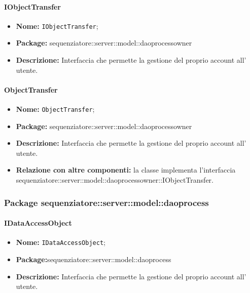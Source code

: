 \paragraph{IObjectTransfer}
	\begin{itemize}
		\item \textbf{Nome:} \texttt{IObjectTransfer};
		\item \textbf{Package:} sequenziatore::server::model::daoprocessowner
		\item \textbf{Descrizione:} Interfaccia che permette la gestione del proprio account all' utente.
	\end{itemize}
\paragraph{ObjectTransfer}
	\begin{itemize}
		\item \textbf{Nome:} \texttt{ObjectTransfer};
		\item \textbf{Package:} sequenziatore::server::model::daoprocessowner
		\item \textbf{Descrizione:} Interfaccia che permette la gestione del proprio account all' utente.
		\item \textbf{Relazione con altre componenti:} la classe implementa l'interfaccia sequenziatore::server::model::daoprocessowner::IObjectTransfer.
	\end{itemize}
\subsubsection{Package sequenziatore::server::model::daoprocess}
\paragraph{IDataAccessObject}
	\begin{itemize}
		\item \textbf{Nome:} \texttt{IDataAccessObject};
		\item \textbf{Package:}sequenziatore::server::model::daoprocess
		\item \textbf{Descrizione:} Interfaccia che permette la gestione del proprio account all' utente.
	\end{itemize}
